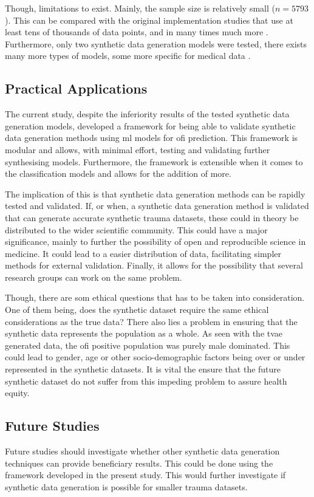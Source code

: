 \documentclass[12pt, a4paper]{article}
\begin{document}
Though, limitations to exist. Mainly, the sample size is relatively small ($n = 5793$). This can be compared with the original implementation studies that use at least tens of thousands of data points, and in many times much more \cite{}. Furthermore, only two synthetic data generation models were tested, there exists many more types of models, some more specific for medical data \cite{hernandez_synthetic_2022}.

\subsection{Practical Applications}
The current study, despite the inferiority results of the tested synthetic data generation models, developed a framework for being able to validate synthetic data generation methods using \acrshort{ml} models for \acrshort{ofi} prediction. This framework is modular and allows, with minimal effort, testing and validating further synthesising models. Furthermore, the framework is extensible when it comes to the classification models and allows for the addition of more.

The implication of this is that synthetic data generation methods can be rapidly tested and validated. If, or when, a synthetic data generation method is validated that can generate accurate synthetic trauma datasets, these could in theory be distributed to the wider scientific community. This could have a major significance, mainly to further the possibility of open and reproducible science in medicine. It could lead to a easier distribution of data, facilitating simpler methods for external validation. Finally, it allows for the possibility that several research groups can work on the same problem.

Though, there are som ethical questions that has to be taken into consideration. One of them being, does the synthetic dataset require the same ethical considerations as the true data? There also lies a problem in ensuring that the synthetic data represents the population as a whole. As seen with the \acrshort{tvae} generated data, the \acrshort{ofi} positive population was purely male dominated. This could lead to gender, age or other socio-demographic factors being over or under represented in the synthetic datasets. It is vital the ensure that the future synthetic dataset do not suffer from this impeding problem to assure health equity.

\subsection{Future Studies}
Future studies should investigate whether other synthetic data generation techniques can provide beneficiary results. This could be done using the framework developed in the present study. This would further investigate if synthetic data generation is possible for smaller trauma datasets.
\end{document}
